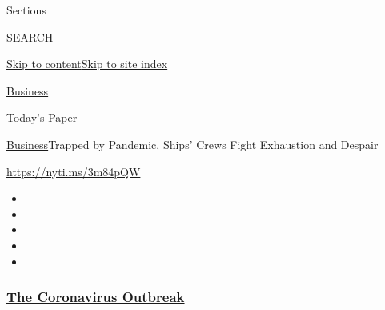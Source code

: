 Sections

SEARCH

\protect\hyperlink{site-content}{Skip to
content}\protect\hyperlink{site-index}{Skip to site index}

\href{https://www.nytimes3xbfgragh.onion/section/business}{Business}

\href{https://myaccount.nytimes3xbfgragh.onion/auth/login?response_type=cookie\&client_id=vi}{}

\href{https://www.nytimes3xbfgragh.onion/section/todayspaper}{Today's
Paper}

\href{/section/business}{Business}\textbar{}Trapped by Pandemic, Ships'
Crews Fight Exhaustion and Despair

\url{https://nyti.ms/3m84pQW}

\begin{itemize}
\item
\item
\item
\item
\item
\end{itemize}

\hypertarget{the-coronavirus-outbreak}{%
\subsubsection{\texorpdfstring{\href{https://www.nytimes3xbfgragh.onion/news-event/coronavirus?name=styln-coronavirus-markets\&region=TOP_BANNER\&block=storyline_menu_recirc\&action=click\&pgtype=Article\&impression_id=0407ed00-f282-11ea-b183-fd6e653e4bb2\&variant=undefined}{The
Coronavirus
Outbreak}}{The Coronavirus Outbreak}}\label{the-coronavirus-outbreak}}

